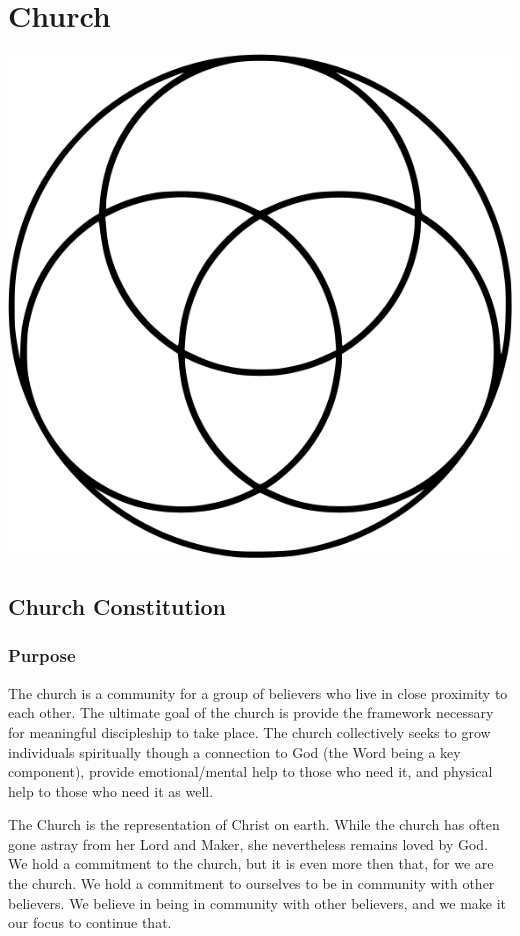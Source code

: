 \documentclass[CSHFoundation.tex]{subfiles}
\begin{document}
\chapter{Church}
\centerline{\includegraphics[scale=0.35]{6-Clogo.png}}
\section{Church Constitution}
\subsection{Purpose}

The church is a community for a group of believers who live in close proximity to each other. The ultimate goal of the church is provide the framework necessary for meaningful discipleship to take place. The church collectively seeks to grow individuals spiritually though a connection to God (the Word being a key component), provide emotional/mental help to those who need it, and physical help to those who need it as well.



The Church is the representation of Christ on earth. While the church has often gone astray from her Lord and Maker, she nevertheless remains loved by God. We hold a commitment to the church, but it is even more then that, for we are the church. We hold a commitment to ourselves to be in community with other believers. We believe in being in community with other believers, and we make it our focus to continue that.
\end{document}
